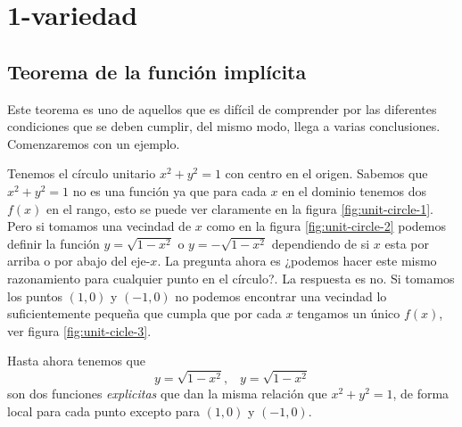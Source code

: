 \chapter{1-variedad}
\section{Teorema de la funci\'on impl\'icita}
Este teorema es uno de aquellos que es dif\'icil de comprender por las
diferentes condiciones que se deben cumplir, del mismo modo, llega a 
varias conclusiones. Comenzaremos con un ejemplo.

\begin{example}
    Tenemos el c\'irculo unitario $x^{2} + y^{2} = 1$ con centro en el
    origen. Sabemos que  $x^{2} + y^{2} = 1$ no es una funci\'on ya que
    para cada $x$ en el dominio tenemos dos $f(x)$ en el rango, esto se
    puede ver claramente en la figura \ref{fig:unit-circle-1}. Pero si
    tomamos una vecindad de $x$ como en la figura \ref{fig:unit-circle-2}
    podemos definir la funci\'on $y = \sqrt{1-x^{2}}$ o $y = -\sqrt{1-x^{2}}$
    dependiendo de si $x$ esta por arriba o por abajo del eje-$x$. La
    pregunta ahora es ¿podemos hacer este mismo razonamiento para cualquier
    punto en el c\'irculo?. La respuesta es no. Si tomamos los puntos
    $(1,0)$ y $(-1,0)$ no podemos encontrar una vecindad lo suficientemente
    pequeña que cumpla que por cada $x$ tengamos un \'unico $f(x)$, ver
    figura \ref{fig:unit-cicle-3}.

    Hasta ahora tenemos que
    $$y = \sqrt{1-x^{2}} \text{,} \quad y = \sqrt{1-x^{2}}$$
    son dos funciones \emph{explicitas} que dan la misma relaci\'on que
    $x^{2} + y^{2} = 1$, de forma local para cada punto excepto para
    $(1,0)$ y $(-1,0)$.

\end{example}
